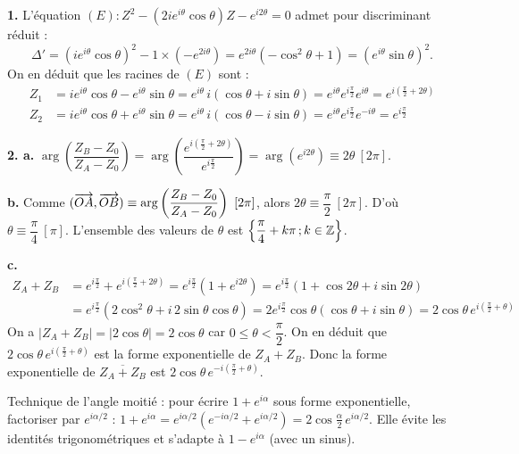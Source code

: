 \documentclass[11pt]{article}
\begin{document}


\textbf{1.} L'équation $(E) : Z^2 - (2ie^{i\theta}\cos\theta)Z - e^{i2\theta} = 0$ admet pour discriminant réduit :
\[ \Delta' = (ie^{i\theta}\cos\theta)^2 - 1 \times (-e^{2i\theta}) = e^{2i\theta}(-\cos^2\theta + 1) = (e^{i\theta}\sin\theta)^2. \]
On en déduit que les racines de $(E)$ sont :
\begin{align*}
Z_1 &= ie^{i\theta}\cos\theta - e^{i\theta}\sin\theta = e^{i\theta}\,i(\cos\theta + i\sin\theta) = e^{i\theta}e^{i\frac{\pi}{2}}e^{i\theta} = e^{i\left(\frac{\pi}{2} + 2\theta\right)} \\
Z_2 &= ie^{i\theta}\cos\theta + e^{i\theta}\sin\theta = e^{i\theta}\,i(\cos\theta - i\sin\theta) = e^{i\theta}e^{i\frac{\pi}{2}}e^{-i\theta} = e^{i\frac{\pi}{2}}
\end{align*}

\textbf{2. a.} $\arg\left(\dfrac{Z_B - Z_0}{Z_A - Z_0}\right) = \arg\left(\dfrac{e^{i\left(\frac{\pi}{2} + 2\theta\right)}}{e^{i\frac{\pi}{2}}}\right) = \arg(e^{i2\theta}) \equiv 2\theta\ [2\pi]$.

\textbf{b.} Comme $(\vv{OA}, \vv{OB}) \equiv \arg\left(\dfrac{Z_B - Z_0}{Z_A - Z_0}\right)\ [2\pi]$, alors $2\theta \equiv \dfrac{\pi}{2}\ [2\pi]$. D'où $\theta \equiv \dfrac{\pi}{4}\ [\pi]$. L'ensemble des valeurs de $\theta$ est $\left\{\dfrac{\pi}{4} + k\pi\,;k \in \mathbb{Z}\right\}$.

\textbf{c.}
\begin{align*}
Z_A + Z_B &= e^{i\frac{\pi}{2}} + e^{i\left(\frac{\pi}{2} + 2\theta\right)} = e^{i\frac{\pi}{2}}(1 + e^{i2\theta}) = e^{i\frac{\pi}{2}}(1 + \cos 2\theta + i\sin 2\theta) \\
&= e^{i\frac{\pi}{2}}(2\cos^2\theta + i\,2\sin\theta\cos\theta) = 2e^{i\frac{\pi}{2}}\cos\theta(\cos\theta + i\sin\theta) = 2\cos\theta\,e^{i\left(\frac{\pi}{2} + \theta\right)}
\end{align*}
On a $|Z_A + Z_B| = |2\cos\theta| = 2\cos\theta$ car $0 \le \theta < \dfrac{\pi}{2}$. On en déduit que $2\cos\theta\,e^{i\left(\frac{\pi}{2} + \theta\right)}$ est la forme exponentielle de $Z_A + Z_B$. Donc la forme exponentielle de $\overline{Z_A + Z_B}$ est $2\cos\theta\,e^{-i\left(\frac{\pi}{2} + \theta\right)}$.

\begin{methode}
Technique de l'angle moitié : pour écrire $1 + e^{i\alpha}$ sous forme
exponentielle, factoriser par $e^{i\alpha/2}$ :
$1 + e^{i\alpha} = e^{i\alpha/2}(e^{-i\alpha/2} + e^{i\alpha/2})
= 2\cos\frac{\alpha}{2}\,e^{i\alpha/2}$. Elle évite les identités
trigonométriques et s'adapte à $1 - e^{i\alpha}$ (avec un sinus).
\end{methode}
\end{document}
